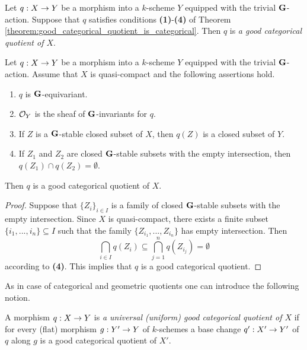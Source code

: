 \begin{definition}
Let $q:X\rightarrow Y$ be a morphism into a $k$-scheme $Y$ equipped with the trivial $\mathbf{G}$-action. Suppose that $q$ satisfies conditions \textbf{(1)}-\textbf{(4)} of Theorem \ref{theorem:good_categorical_quotient_is_categorical}. Then $q$ is \textit{a good categorical quotient of $X$}.
\end{definition}

\begin{proposition}\label{proposition:finite_intersection_property_for_quasi_compact_suffices_for_good_categorical_quotients}
Let $q:X\rightarrow Y$ be a morphism into a $k$-scheme $Y$ equipped with the trivial $\mathbf{G}$-action. Assume that $X$ is quasi-compact and the following assertions hold.
\begin{enumerate}[label=\emph{\textbf{(\arabic*)}}, leftmargin=3.0em]
\item $q$ is $\mathbf{G}$-equivariant.
\item ${\mathcal O}_Y$ is the sheaf of $\mathbf{G}$-invariants for $q$.
\item If $Z$ is a $\mathbf{G}$-stable closed subset of $X$, then $q(Z)$ is a closed subset of $Y$.
\item If $Z_1$ and $Z_2$ are closed $\mathbf{G}$-stable subsets with the empty intersection, then $q(Z_1)\cap q(Z_2) = \emptyset$. 
\end{enumerate}
Then $q$ is a good categorical quotient of $X$.
\end{proposition}
\begin{proof}
Suppose that $\{Z_i\}_{i\in I}$ is a family of closed $\mathbf{G}$-stable subsets with the empty intersection. Since $X$ is quasi-compact, there exists a finite subset $\{i_1,...,i_n\}\subseteq I$ such that the family $\{Z_{i_1},...,Z_{i_n}\}$ has empty intersection. Then
$$\bigcap_{i\in I}q(Z_i)\subseteq \bigcap_{j=1}^nq(Z_{i_j}) = \emptyset$$
according to \textbf{(4)}. This implies that $q$ is a good categorical quotient.
\end{proof}
\noindent
As in case of categorical and geometric quotients one can introduce the following notion.

\begin{definition}
A morphism $q:X\rightarrow Y$ is \textit{a universal (uniform) good categorical quotient of $X$} if for every (flat) morphism $g:Y'\rightarrow Y$ of $k$-schemes a base change $q':X'\rightarrow Y'$ of $q$ along $g$ is a good categorical quotient of $X'$.
\end{definition}


